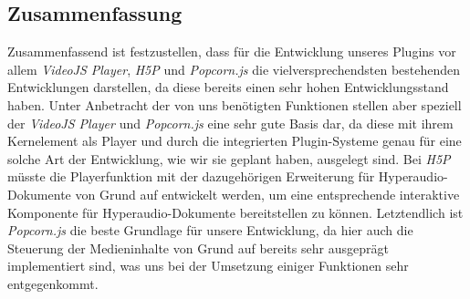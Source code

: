 \subsection{Zusammenfassung}
Zusammenfassend ist festzustellen, dass für die Entwicklung unseres Plugins vor allem \textit{VideoJS Player}, \textit{H5P} und \textit{Popcorn.js} die vielversprechendsten bestehenden Entwicklungen darstellen, da diese bereits einen sehr hohen Entwicklungsstand haben. Unter Anbetracht der von uns benötigten Funktionen stellen aber speziell der \textit{VideoJS Player} und \textit{Popcorn.js} eine sehr gute Basis dar, da diese mit ihrem Kernelement als Player und durch die integrierten Plugin-Systeme genau für eine solche Art der Entwicklung, wie wir sie geplant haben, ausgelegt sind. Bei \textit{H5P} müsste die Playerfunktion mit der dazugehörigen Erweiterung für Hyperaudio-Dokumente von Grund auf entwickelt werden, um eine entsprechende interaktive Komponente für Hyperaudio-Dokumente bereitstellen zu können. Letztendlich ist \textit{Popcorn.js} die beste Grundlage für unsere Entwicklung, da hier auch die Steuerung der Medieninhalte von Grund auf bereits sehr ausgeprägt implementiert sind, was uns bei der Umsetzung einiger Funktionen sehr entgegenkommt.